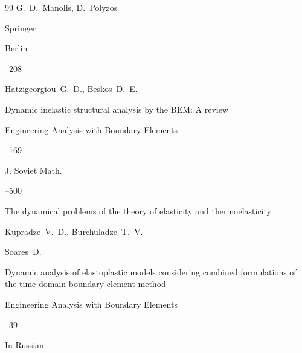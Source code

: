 \begin{thebibliography}{99}
\eds G.~D.~Manolis, D.~Polyzos  

\publ Springer

\publaddr Berlin


--208





\by Hatzigeorgiou~G.~D., Beskos~D.~E.

\paper Dynamic inelastic structural analysis by the BEM: A review

\jour  Engineering Analysis with Boundary Elements




--169






\jour J. Soviet Math.




--500

\paper The dynamical problems of the theory of elasticity and thermoelasticity

\by  Kupradze~V.~D., Burchuladze~T.~V.







\by Soares~D.

\paper Dynamic analysis of elastoplastic models considering combined formulations of the time-domain boundary element method

\jour  Engineering Analysis with Boundary Elements



--39





\lang In Russian


\end{thebibliography}
